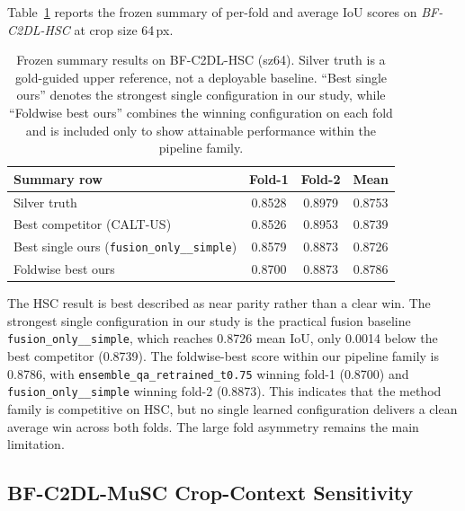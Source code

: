 Table~\ref{tab:hsc_results} reports the frozen summary of per-fold and average IoU scores on
\textit{BF-C2DL-HSC} at crop size 64\,px.

\begin{table}[ht]
\centering
\caption{Frozen summary results on BF-C2DL-HSC (sz64). Silver truth is a gold-guided upper reference, not a deployable baseline. ``Best single ours'' denotes the strongest single configuration in our study, while ``Foldwise best ours'' combines the winning configuration on each fold and is included only to show attainable performance within the pipeline family.}
\label{tab:hsc_results}
\begin{tabular}{lccc}
\hline
\textbf{Summary row} & \textbf{Fold-1} & \textbf{Fold-2} & \textbf{Mean} \\
\hline
Silver truth                             & 0.8528 & 0.8979 & 0.8753 \\
\hline
Best competitor (CALT-US)                & 0.8526 & 0.8953 & 0.8739 \\
Best single ours (\texttt{fusion\_only\_\_simple}) & 0.8579 & 0.8873 & 0.8726 \\
\hline
Foldwise best ours                       & 0.8700 & 0.8873 & 0.8786 \\
\hline
\end{tabular}
\end{table}

The HSC result is best described as near parity rather than a clear win. The strongest single
configuration in our study is the practical fusion baseline \texttt{fusion\_only\_\_simple}, which
reaches 0.8726 mean IoU, only 0.0014 below the best competitor (0.8739). The foldwise-best score
within our pipeline family is 0.8786, with \texttt{ensemble\_qa\_retrained\_t0.75} winning fold-1
(0.8700) and \texttt{fusion\_only\_\_simple} winning fold-2 (0.8873). This indicates that the
method family is competitive on HSC, but no single learned configuration delivers a clean average
win across both folds. The large fold asymmetry remains the main limitation.

\subsection{BF-C2DL-MuSC Crop-Context Sensitivity}
\label{sec:musc_results}

